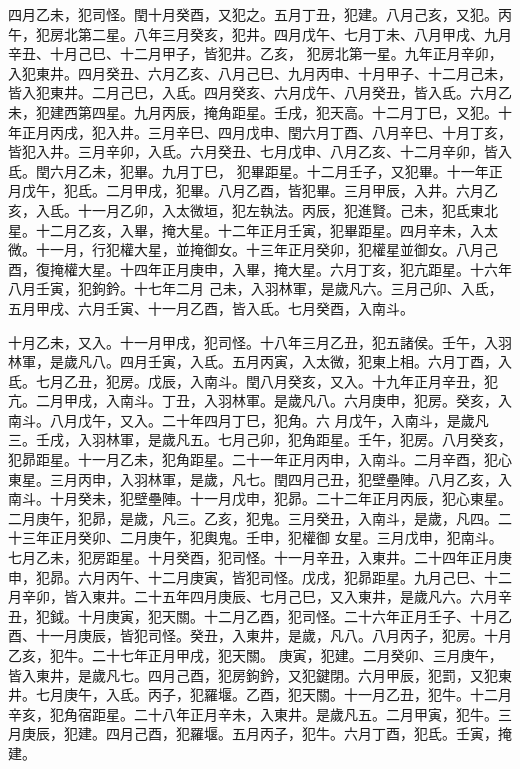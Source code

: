 \begin{pinyinscope}
 四月乙未，犯司怪。閏十月癸酉，又犯之。五月丁丑，犯建。八月己亥，又犯。丙午，犯房北第二星。八年三月癸亥，犯井。四月戊午、七月丁未、八月甲戌、九月辛丑、十月己巳、十二月甲子，皆犯井。乙亥，
 犯房北第一星。九年正月辛卯，入犯東井。四月癸丑、六月乙亥、八月己巳、九月丙申、十月甲子、十二月己未，皆入犯東井。二月己巳，入氐。四月癸亥、六月戊午、八月癸丑，皆入氐。六月乙未，犯建西第四星。九月丙辰，掩角距星。壬戌，犯天高。十二月丁巳，又犯。十年正月丙戌，犯入井。三月辛巳、四月戊申、閏六月丁酉、八月辛巳、十月丁亥，皆犯入井。三月辛卯，入氐。六月癸丑、七月戊申、八月乙亥、十二月辛卯，皆入氐。閏六月乙未，犯畢。九月丁巳，
 犯畢距星。十二月壬子，又犯畢。十一年正月戊午，犯氐。二月甲戌，犯畢。八月乙酉，皆犯畢。三月甲辰，入井。六月乙亥，入氐。十一月乙卯，入太微垣，犯左執法。丙辰，犯進賢。己未，犯氐東北星。十二月乙亥，入畢，掩大星。十二年正月壬寅，犯畢距星。四月辛未，入太微。十一月，行犯權大星，並掩御女。十三年正月癸卯，犯權星並御女。八月己酉，復掩權大星。十四年正月庚申，入畢，掩大星。六月丁亥，犯亢距星。十六年八月壬寅，犯鉤鈐。十七年二月
 己未，入羽林軍，是歲凡六。三月己卯、入氐，五月甲戌、六月壬寅、十一月乙酉，皆入氐。七月癸酉，入南斗。



 十月乙未，又入。十一月甲戌，犯司怪。十八年三月乙丑，犯五諸侯。壬午，入羽林軍，是歲凡八。四月壬寅，入氐。五月丙寅，入太微，犯東上相。六月丁酉，入氐。七月乙丑，犯房。戊辰，入南斗。閏八月癸亥，又入。十九年正月辛丑，犯亢。二月甲戌，入南斗。丁丑，入羽林軍。是歲凡八。六月庚申，犯房。癸亥，入南斗。八月戊午，又入。二十年四月丁巳，犯角。六
 月戊午，入南斗，是歲凡三。壬戌，入羽林軍，是歲凡五。七月己卯，犯角距星。壬午，犯房。八月癸亥，犯昴距星。十一月乙未，犯角距星。二十一年正月丙申，入南斗。二月辛酉，犯心東星。三月丙申，入羽林軍，是歲，凡七。閏四月己丑，犯壁壘陣。八月乙亥，入南斗。十月癸未，犯壁壘陣。十一月戊申，犯昴。二十二年正月丙辰，犯心東星。二月庚午，犯昴，是歲，凡三。乙亥，犯鬼。三月癸丑，入南斗，是歲，凡四。二十三年正月癸卯、二月庚午，犯輿鬼。壬申，犯權御
 女星。三月戊申，犯南斗。七月乙未，犯房距星。十月癸酉，犯司怪。十一月辛丑，入東井。二十四年正月庚申，犯昴。六月丙午、十二月庚寅，皆犯司怪。戊戌，犯昴距星。九月己巳、十二月辛卯，皆入東井。二十五年四月庚辰、七月己巳，又入東井，是歲凡六。六月辛丑，犯鉞。十月庚寅，犯天關。十二月乙酉，犯司怪。二十六年正月壬子、十月乙酉、十一月庚辰，皆犯司怪。癸丑，入東井，是歲，凡八。八月丙子，犯房。十月乙亥，犯牛。二十七年正月甲戌，犯天關。
 庚寅，犯建。二月癸卯、三月庚午，皆入東井，是歲凡七。四月己酉，犯房鉤鈐，又犯鍵閉。六月甲辰，犯罰，又犯東井。七月庚午，入氐。丙子，犯羅堰。乙酉，犯天關。十一月乙丑，犯牛。十二月辛亥，犯角宿距星。二十八年正月辛未，入東井。是歲凡五。二月甲寅，犯牛。三月庚辰，犯建。四月己酉，犯羅堰。五月丙子，犯牛。六月丁酉，犯氐。壬寅，掩建。




\end{pinyinscope}
